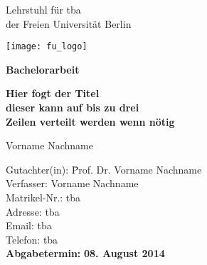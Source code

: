 
\thispagestyle{empty}

\begin{center}

\vspace*{-20mm}

{\LARGE Lehrstuhl für tba\\[1mm]}
der Freien Universität Berlin\\

\vspace*{1cm}

\texttt{[image: fu\_logo]}

\vspace*{1cm}

{\Large \textbf{Bachelorarbeit}}\\ 

\vspace{1cm}

{\Large \textbf{Hier fogt der Titel}}\\ 
\vspace*{1mm}
{\Large \textbf{dieser kann auf bis zu drei}}\\ 
\vspace*{1mm}
{\Large \textbf{Zeilen verteilt werden wenn nötig}}\\
\vspace*{2mm}

\vspace{1.5cm}

{\LARGE Vorname Nachname}\\[25mm]

\parbox{120mm}{
\begin{large}
\begin{tabbing}
Gutachter(in): \hspace{.7cm} \= Prof. Dr. Vorname Nachname \\[4mm]
Verfasser:\> Vorname Nachname\\ %
Matrikel-Nr.:\> tba\\
Adresse:\> tba\\
Email:\> tba\\
Telefon:\> tba\\[8mm]
\textbf{Abgabetermin:} \> \textbf{08. August 2014}\\
\end{tabbing}
\end{large}
}

\end{center}
